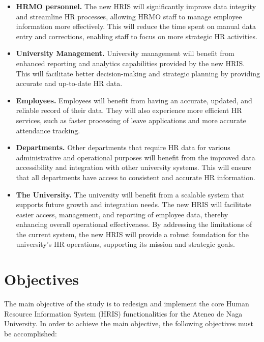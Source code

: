     \begin{itemize}
        \item[] \textbf{HRMO personnel.} The new HRIS will significantly improve data integrity and streamline HR processes, allowing HRMO staff to manage employee information more effectively. This will reduce the time spent on manual data entry and corrections, enabling staff to focus on more strategic HR activities.

        \item[] \textbf{University Management.} University management will benefit from enhanced reporting and analytics capabilities provided by the new HRIS. This will facilitate better decision-making and strategic planning by providing accurate and up-to-date HR data.

        \item[] \textbf{Employees.} Employees will benefit from having an accurate, updated, and reliable record of their data. They will also experience more efficient HR services, such as faster processing of leave applications and more accurate attendance tracking. 

        \item[] \textbf{Departments.} Other departments that require HR data for various administrative and operational purposes will benefit from the improved data accessibility and integration with other university systems. This will ensure that all departments have access to consistent and accurate HR information.

        \item[] \textbf{The University.} The university will benefit from a scalable system that supports future growth and integration needs. The new HRIS will facilitate easier access, management, and reporting of employee data, thereby enhancing overall operational effectiveness. By addressing the limitations of the current system, the new HRIS will provide a robust foundation for the university's HR operations, supporting its mission and strategic goals.
    \end{itemize}
    
\section{Objectives}

    The main objective of the study is to redesign and implement the core Human Resource Information System (HRIS) functionalities for the Ateneo de Naga University. In order to achieve the main objective, the following objectives must be accomplished:

